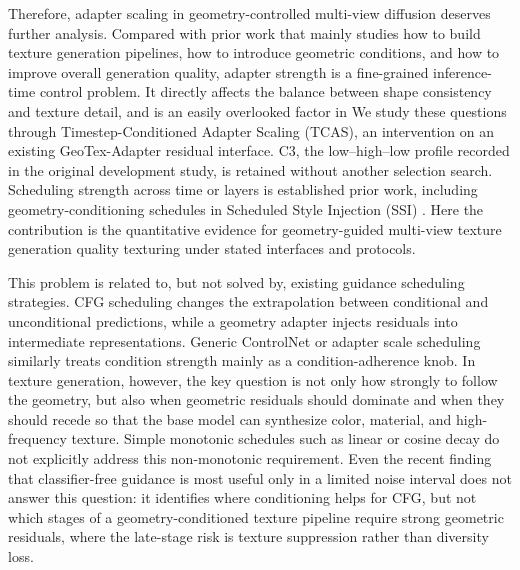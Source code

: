 \documentclass[times,twocolumn,final]{elsarticle}
\providecommand{\DIFadd}[1]{{\protect\color{blue} \sf #1}} %
\providecommand{\DIFdel}[1]{{\protect\color{red} \scriptsize #1}} %
\providecommand{\DIFaddbegin}{} %
\providecommand{\DIFaddend}{} %
\providecommand{\DIFdelbegin}{} %
\providecommand{\DIFdelend}{} %
\begin{document}
\DIFdelbegin \DIFdel{Therefore, adapter scaling in geometry-controlled multi-view diffusion deserves further analysis. Compared with prior work that mainly studies how to build texture generation pipelines, how to introduce geometric conditions, and how to improve overall generation quality, adapter strength is a fine-grained inference-time control problem. It directly affects the balance between shape consistency and texture detail, and is an easily overlooked factor in }\DIFdelend \DIFaddbegin \DIFadd{We study these questions through Timestep-Conditioned Adapter Scaling (TCAS), an intervention on an existing GeoTex-Adapter residual interface. C3, the low--high--low profile recorded in the original development study, is retained without another selection search. Scheduling strength across time or layers is established prior work, including geometry-conditioning schedules in Scheduled Style Injection (SSI) \cite{kulkarni2026ssi}. Here the contribution is the quantitative evidence for geometry-guided }\DIFaddend multi-view \DIFdelbegin \DIFdel{texture generation quality}\DIFdelend \DIFaddbegin \DIFadd{texturing under stated interfaces and protocols}\DIFaddend .

\DIFdelbegin \DIFdel{This problem is related to, but not solved by, existing guidance scheduling strategies. CFG scheduling changes the extrapolation between conditional and unconditional predictions, while a geometry adapter injects residuals into intermediate representations. Generic ControlNet or adapter scale scheduling similarly treats condition strength mainly as a condition-adherence knob. In texture generation, however, the key question is not only how strongly to follow the geometry, but also when geometric residuals should dominate and when they should recede so that the base model can synthesize color, material, and high-frequency texture. Simple monotonic schedules such as linear or cosine decay do not explicitly address this non-monotonic requirement. Even the recent finding that classifier-free guidance is most useful only in a limited noise interval \cite{kynkanniemi2024limited} does not answer this question: it identifies where conditioning helps for CFG, but not which stages of a geometry-conditioned texture pipeline require strong geometric residuals, where the late-stage risk is texture suppression rather than diversity loss. }%
\end{document}
